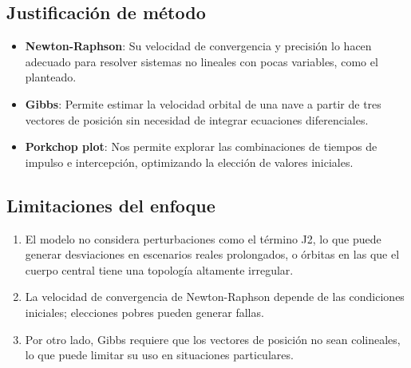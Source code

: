 \newpage

\subsection{Justificación de método}
\begin{itemize}
    \item \textbf{Newton-Raphson}: Su velocidad de convergencia y precisión lo hacen adecuado para resolver sistemas no lineales con pocas variables, como el planteado.
    \item \textbf{Gibbs}: Permite estimar la velocidad orbital de una nave a partir de tres vectores de posición sin necesidad de integrar ecuaciones diferenciales.
    \item \textbf{Porkchop plot}: Nos permite explorar las combinaciones de tiempos de impulso e intercepción, optimizando la elección de valores iniciales.
\end{itemize}

\subsection{Limitaciones del enfoque}

\begin{enumerate}
    \item El modelo no considera perturbaciones como el término J2, lo que puede generar
          desviaciones en escenarios reales prolongados, o órbitas en las que el cuerpo
          central tiene una topología altamente irregular.

    \item La velocidad de convergencia de Newton-Raphson depende de las condiciones
          iniciales; elecciones pobres pueden generar fallas.

    \item Por otro lado, Gibbs requiere que los vectores de posición no sean colineales,
          lo que puede limitar su uso en situaciones particulares.
\end{enumerate}

